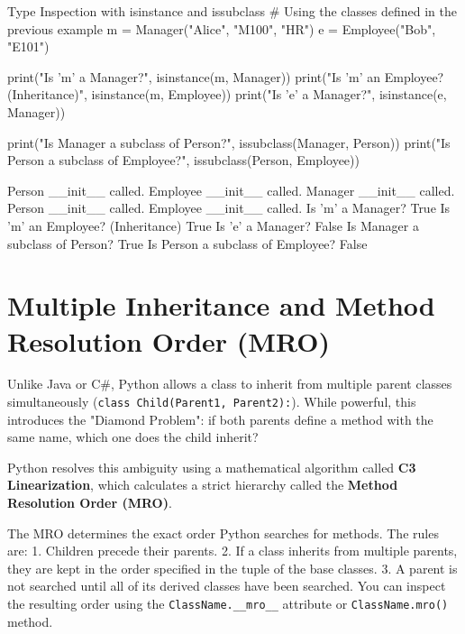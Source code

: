 \begin{pythoncode}{Type Inspection with isinstance and issubclass}
# Using the classes defined in the previous example
m = Manager("Alice", "M100", "HR")
e = Employee("Bob", "E101")

print("Is 'm' a Manager?", isinstance(m, Manager))
print("Is 'm' an Employee? (Inheritance)", isinstance(m, Employee))
print("Is 'e' a Manager?", isinstance(e, Manager))

print("Is Manager a subclass of Person?", issubclass(Manager, Person))
print("Is Person a subclass of Employee?", issubclass(Person, Employee))
\end{pythoncode}

\begin{outputbox}
Person __init__ called.
Employee __init__ called.
Manager __init__ called.
Person __init__ called.
Employee __init__ called.
Is 'm' a Manager? True
Is 'm' an Employee? (Inheritance) True
Is 'e' a Manager? False
Is Manager a subclass of Person? True
Is Person a subclass of Employee? False
\end{outputbox}

\section{Multiple Inheritance and Method Resolution Order (MRO)}

Unlike Java or C\#, Python allows a class to inherit from multiple parent classes simultaneously (\texttt{class Child(Parent1, Parent2):}). While powerful, this introduces the "Diamond Problem": if both parents define a method with the same name, which one does the child inherit?

Python resolves this ambiguity using a mathematical algorithm called \textbf{C3 Linearization}, which calculates a strict hierarchy called the \textbf{Method Resolution Order (MRO)}.

\begin{conceptbox}
The MRO determines the exact order Python searches for methods. The rules are:
1. Children precede their parents.
2. If a class inherits from multiple parents, they are kept in the order specified in the tuple of the base classes.
3. A parent is not searched until all of its derived classes have been searched.
You can inspect the resulting order using the \texttt{ClassName.\_\_mro\_\_} attribute or \texttt{ClassName.mro()} method.
\end{conceptbox}


